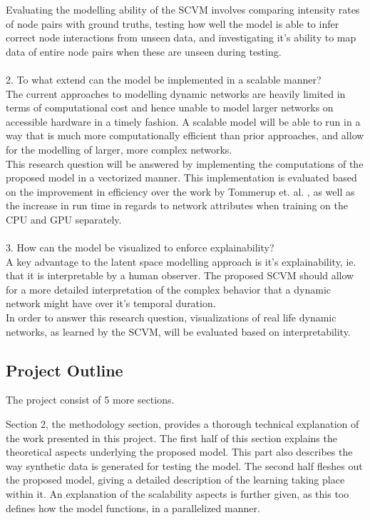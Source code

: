 Evaluating the modelling ability of the SCVM involves comparing intensity rates of node pairs with ground truths, testing how well the model is able to infer correct node interactions from unseen data, and investigating it's ability to map data of entire node pairs when these are unseen during testing.
\\\\
\hspace*{5mm} 2. To what extend can the model be implemented in a scalable manner?
\\
The current approaches to modelling dynamic networks are heavily limited in terms of computational cost and hence unable to model larger networks on accessible hardware in a timely fashion.
A scalable model will be able to run in a way that is much more computationally efficient than prior approaches, and allow for the modelling of larger, more complex networks.
\\
This research question will be answered by implementing the computations of the proposed model in a vectorized manner.
This implementation is evaluated based on the improvement in efficiency over the work by Tommerup et. al. \cite{Tommerup2021LearningNetworks}, as well as the increase in run time in regards to network attributes when training on the CPU and GPU separately.
\\\\
\hspace*{5mm} 3. How can the model be visualized to enforce explainability?
\\
A key advantage to the latent space modelling approach is it's explainability, ie. that it is interpretable by a human observer.
The proposed SCVM should allow for a more detailed interpretation of the complex behavior that a dynamic network might have over it's temporal duration.
\\
In order to answer this research question, visualizations of real life dynamic networks, as learned by the SCVM, will be evaluated based on interpretability. 



\subsection{Project Outline}
\label{sec:Intro:ThesisOutline}
The project consist of 5 more sections.

Section 2, the methodology section, provides a thorough technical explanation of the work presented in this project.
The first half of this section explains the theoretical aspects underlying the proposed model.
This part also describes the way synthetic data is generated for testing the model.
The second half fleshes out the proposed model, giving a detailed description of the learning taking place within it.
An explanation of the scalability aspects is further given, as this too defines how the model functions, in a parallelized manner.

